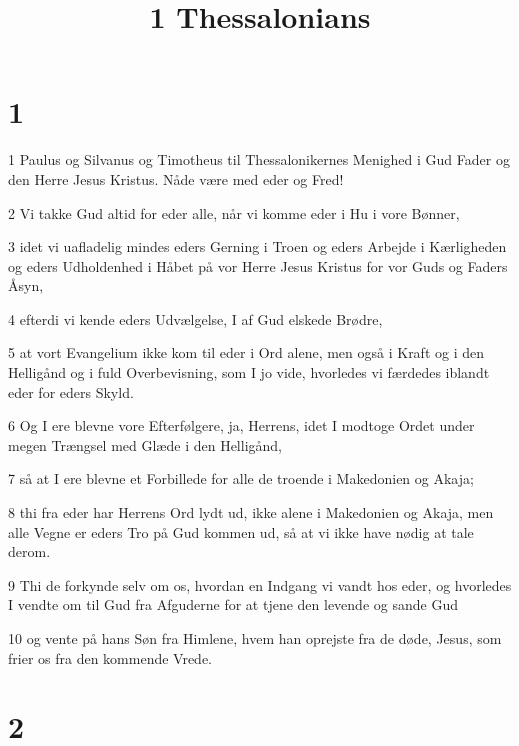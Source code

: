 

\title{1 Thessalonians}


\chapter{1}

\par 1 Paulus og Silvanus og Timotheus til Thessalonikernes Menighed i Gud Fader og den Herre Jesus Kristus. Nåde være med eder og Fred!
\par 2 Vi takke Gud altid for eder alle, når vi komme eder i Hu i vore Bønner,
\par 3 idet vi uafladelig mindes eders Gerning i Troen og eders Arbejde i Kærligheden og eders Udholdenhed i Håbet på vor Herre Jesus Kristus for vor Guds og Faders Åsyn,
\par 4 efterdi vi kende eders Udvælgelse, I af Gud elskede Brødre,
\par 5 at vort Evangelium ikke kom til eder i Ord alene, men også i Kraft og i den Helligånd og i fuld Overbevisning, som I jo vide, hvorledes vi færdedes iblandt eder for eders Skyld.
\par 6 Og I ere blevne vore Efterfølgere, ja, Herrens, idet I modtoge Ordet under megen Trængsel med Glæde i den Helligånd,
\par 7 så at I ere blevne et Forbillede for alle de troende i Makedonien og Akaja;
\par 8 thi fra eder har Herrens Ord lydt ud, ikke alene i Makedonien og Akaja, men alle Vegne er eders Tro på Gud kommen ud, så at vi ikke have nødig at tale derom.
\par 9 Thi de forkynde selv om os, hvordan en Indgang vi vandt hos eder, og hvorledes I vendte om til Gud fra Afguderne for at tjene den levende og sande Gud
\par 10 og vente på hans Søn fra Himlene, hvem han oprejste fra de døde, Jesus, som frier os fra den kommende Vrede.

\chapter{2}

